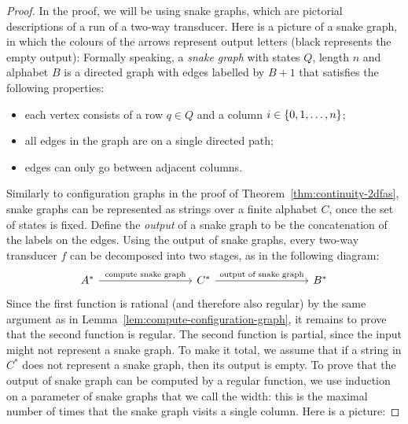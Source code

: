 \begin{proof}
    In the proof, we will be using snake graphs, which are pictorial descriptions of a run of a two-way transducer. Here is a picture of a snake graph, in which the colours of the arrows represent output letters (black represents the empty output):
    Formally speaking,  a \emph{snake graph} with states $Q$, length $n$ and alphabet $B$ is a directed graph with edges labelled by $B+1$  that satisfies the following properties:
    \begin{itemize}
        \item each vertex consists of a row $q \in Q$ and a column $i \in \{0,1,\ldots,n\}$;
        \item all edges in the graph are on a single directed path;
        \item edges can only go between adjacent columns.
    \end{itemize}
 Similarly to configuration graphs in the proof of Theorem~\ref{thm:continuity-2dfas}, snake graphs can be represented as strings over a finite alphabet $C$, once the set of states is fixed.     Define the \emph{output} of a snake graph to be the concatenation of the labels on the edges. Using the output of snake graphs, every two-way transducer $f$ can be decomposed into two stages, as in the following diagram:  \[
    \begin{tikzcd}[column sep=3cm]
    A^* \ar[r,"\text{compute snake graph}"] &
    C^* \ar[r,"\text{output of snake graph}"] & 
    B^*
    \end{tikzcd}
    \]
Since the first function is rational (and therefore also regular) by the same argument as in Lemma~\ref{lem:compute-configuration-graph}, it remains to prove that the second function is regular. 
    The second  function  is partial, since the input might not represent a snake graph. To make it total, we assume that if a string in $C^*$ does not represent a snake graph, then its output is empty. To prove that the output of snake graph can be computed by a regular function, we use induction on  a parameter of snake graphs that we call the width: this is the maximal number of times that the snake graph visits a single column. Here is a picture:


\end{proof}
